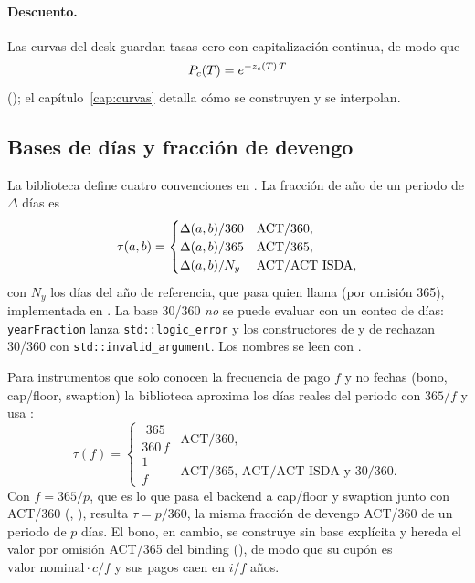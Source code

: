 \begin{sloppypar}
\paragraph{Descuento.} Las curvas del desk guardan tasas cero con capitalización continua, de modo que
\begin{equation}\label{eq:cap01-descuento}
  P_{c}(T) = e^{-z_{c}(T)\,T}
\end{equation}
(); el capítulo~\ref{cap:curvas} detalla
cómo se construyen y se interpolan.

\subsection{Bases de días y fracción de devengo}\label{sec:cap01-bases}

La biblioteca define cuatro convenciones en . La
fracción de año de un periodo de $\Delta$ días es
\begin{equation}\label{eq:cap01-bases}
  \tau(a,b)=\begin{cases}
    \Delta(a,b)/360 & \text{ACT/360},\\
    \Delta(a,b)/365 & \text{ACT/365},\\
    \Delta(a,b)/N_y & \text{ACT/ACT ISDA},
  \end{cases}
\end{equation}
con $N_y$ los días del año de referencia, que pasa quien llama (por omisión 365),
implementada en . La base 30/360 \emph{no} se puede evaluar con un
conteo de días: \texttt{yearFraction} lanza \texttt{std::logic\_error} y los constructores de
 y de
 rechazan 30/360 con \texttt{std::invalid\_argument}.
Los nombres se leen con .

Para instrumentos que solo conocen la frecuencia de pago $f$ y no fechas (bono, cap/floor, swaption) la
biblioteca aproxima los días reales del periodo con $365/f$ y usa
:
\begin{equation}\label{eq:cap01-periodo-uniforme}
  \tau(f)=\begin{cases}
    \dfrac{365}{360\,f} & \text{ACT/360},\\[1ex]
    \dfrac{1}{f} & \text{ACT/365, ACT/ACT ISDA y 30/360}.
  \end{cases}
\end{equation}
Con $f=365/p$, que es lo que pasa el backend a cap/floor y swaption junto con ACT/360
(, ),
resulta $\tau=p/360$, la misma fracción de devengo ACT/360 de un periodo de $p$ días. El bono, en cambio, se
construye sin base explícita y hereda el valor por omisión ACT/365 del binding
(), de modo que su cupón es $\text{valor nominal}\cdot c/f$ y
sus pagos caen en $i/f$ años.


\end{sloppypar}
